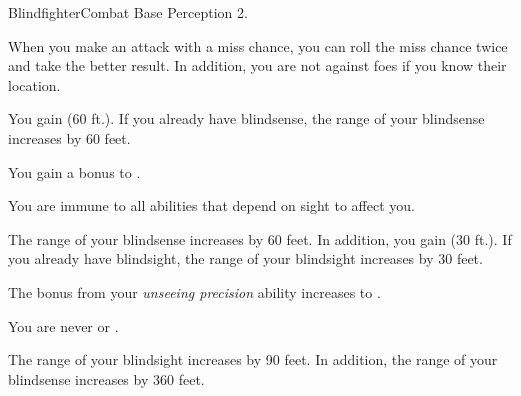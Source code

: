     \begin{feat}{Blindfighter}{Combat}
        \featpre Base Perception 2.

         When you make an attack with a miss chance, you can roll the miss chance twice and take the better result.
        In addition, you are not \partiallyunaware against foes if you know their location.

         You gain  (60 ft.).
        If you already have blindsense, the range of your blindsense increases by 60 feet.

         You gain a  bonus to .

         You are immune to all abilities that depend on sight to affect you.

         The range of your blindsense increases by 60 feet.
        In addition, you gain  (30 ft.).
        If you already have blindsight, the range of your blindsight increases by 30 feet.

         The bonus from your \textit{unseeing precision} ability increases to .

         You are never \unaware or \partiallyunaware.

         The range of your blindsight increases by 90 feet.
        In addition, the range of your blindsense increases by 360 feet.
    \end{feat}

